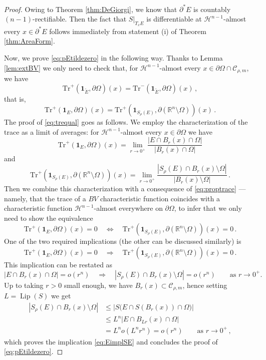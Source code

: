 \documentclass[a4paper,reqno,11pt]{amsart}
\newcommand{\R}{\mathbb{R}}
\newcommand{\Hau}{{\mathcal H}} %
\newcommand{\de}{\partial}
\newcommand{\ch}{\mathbf{1}}
\newcommand{\cC}{\mathcal{C}}
\newcommand{\Lip}{\mathop{\mathrm{Lip}}}
\newcommand{\Tr}{{\mathrm{Tr}}}
\begin{document}
\begin{proof}
Owing to Theorem \ref{thm:DeGiorgi}, we know that $\de^\ast E$ is countably $(n-1)$-rectifiable. Then the fact that $S|_{T_x E}$ is differentiable at $\Hau^{n-1}$-almost every $x \in \de^\ast E$ follows immediately from statement (i) of Theorem \ref{thm:AreaForm}.

Now, we prove \eqref{eq:pEtildezero} in the following way. 
Thanks to Lemma \ref{lem:extBV} we only need to check that, for $\Hau^{n-1}$-almost every $x\in \de \Omega\cap \cC_{\rho,m}$, we have
\[
\Tr^{+}(\ch_{\tilde E},\de\Omega)(x) = \Tr^{-}(\ch_{\tilde E},\de\Omega)(x)\,,
\]
that is,
\begin{equation}\label{eq:trequal}
\Tr^{+}(\ch_{E},\de\Omega)(x) = \Tr^{+}(\ch_{S_{\rho}(E)},\de(\R^{n}\setminus \Omega))(x)\,.
\end{equation}
The proof of \eqref{eq:trequal} goes as follows. We employ the characterization of the trace as a limit of averages: for $\Hau^{n-1}$-almost every $x\in \de\Omega$ we have
\[
\Tr^{+}(\ch_{E},\de\Omega)(x) = \lim_{r\to 0^{+}}\frac{|E\cap B_{r}(x)\cap \Omega|}{|B_{r}(x)\cap \Omega|}
\]
and
\[
\Tr^{+}(\ch_{S_{\rho}(E)},\de(\R^{n}\setminus \Omega))(x) = \lim_{r\to 0^{+}}\frac{|S_{\rho}(E)\cap B_{r}(x)\setminus \Omega|}{|B_{r}(x)\setminus \Omega|}\,.
\]
Then we combine this characterization with a consequence of \eqref{eq:proptrace} --- namely, that the trace of a $BV$ characteristic function coincides with a characteristic function $\Hau^{n-1}$-almost everywhere on $\de\Omega$, to infer that we only need to show the equivalence 
\[
\Tr^{+}(\ch_{E},\de\Omega)(x) = 0 \quad\Leftrightarrow\quad \Tr^{+}(\ch_{S_{\rho}(E)},\de(\R^{n}\setminus \Omega))(x) = 0\,.
\]
One of the two required implications (the other can be discussed similarly) is
\[
\Tr^{+}(\ch_{E},\de\Omega)(x) = 0\quad\Rightarrow\quad \Tr^{+}(\ch_{S_{\rho}(E)},\de(\R^{n}\setminus \Omega))(x) = 0\,.
\]
This implication can be restated as 
\begin{equation}\label{eq:EimplSE}
|E\cap B_{r}(x)\cap \Omega| = o(r^{n})\quad\Rightarrow\quad |S_{\rho}(E)\cap B_{r}(x)\setminus \Omega| = o(r^{n})\qquad \text{as $r\to 0^{+}$.}
\end{equation}
Up to taking $r>0$ small enough, we have $B_{r}(x) \subset \cC_{\rho,m}$, hence setting $L = \Lip(S)$ we get
\begin{align*}
|S_{\rho}(E)\cap B_{r}(x)\setminus \Omega| &\le |S\big(E\cap S(B_{r}(x))\cap \Omega\big)|\\
&\le L^{n}|E \cap B_{Lr}(x)\cap \Omega|\\
&= L^{n}o(L^{n}r^{n}) = o(r^{n})\qquad \text{as }r\to 0^{+}\,,
\end{align*}
which proves the implication \eqref{eq:EimplSE} and concludes the proof of \eqref{eq:pEtildezero}.


\end{proof}
\end{document}
